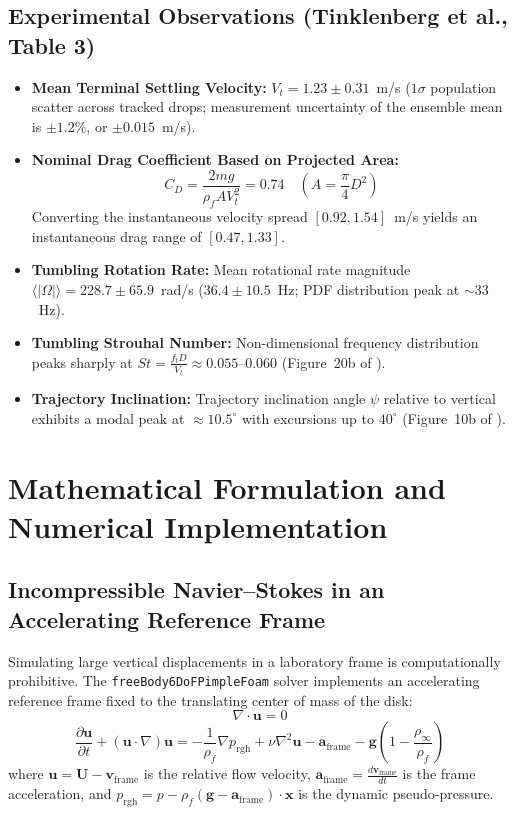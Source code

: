 \documentclass[11pt,a4paper]{article}
\begin{document}
\subsection{Experimental Observations (Tinklenberg et al., Table 3)}
\begin{itemize}
    \item \textbf{Mean Terminal Settling Velocity:} $V_t = 1.23 \pm 0.31$~m/s ($1\sigma$ population scatter across tracked drops; measurement uncertainty of the ensemble mean is $\pm 1.2\%$, or $\pm 0.015$~m/s).
    \item \textbf{Nominal Drag Coefficient Based on Projected Area:}
    \begin{equation}
    C_D = \frac{2 m g}{\rho_f A V_t^2} = 0.74 \quad \left(A = \frac{\pi}{4} D^2\right)
    \end{equation}
    Converting the instantaneous velocity spread $[0.92, 1.54]$~m/s yields an instantaneous drag range of $[0.47, 1.33]$.
    \item \textbf{Tumbling Rotation Rate:} Mean rotational rate magnitude $\langle |\Omega| \rangle = 228.7 \pm 65.9$~rad/s ($36.4 \pm 10.5$~Hz; PDF distribution peak at $\sim 33$~Hz).
    \item \textbf{Tumbling Strouhal Number:} Non-dimensional frequency distribution peaks sharply at $St = \frac{f_t D}{V_t} \approx 0.055$--$0.060$ (Figure~20b of \cite{tinklenberg2023}).
    \item \textbf{Trajectory Inclination:} Trajectory inclination angle $\psi$ relative to vertical exhibits a modal peak at $\approx 10.5^\circ$ with excursions up to $40^\circ$ (Figure~10b of \cite{tinklenberg2023}).
\end{itemize}

\section{Mathematical Formulation and Numerical Implementation}

\subsection{Incompressible Navier--Stokes in an Accelerating Reference Frame}
Simulating large vertical displacements in a laboratory frame is computationally prohibitive. The \texttt{freeBody6DoFPimpleFoam} solver implements an accelerating reference frame fixed to the translating center of mass of the disk:
\begin{equation}
\nabla \cdot \mathbf{u} = 0
\end{equation}
\begin{equation}
\frac{\partial \mathbf{u}}{\partial t} + (\mathbf{u} \cdot \nabla)\mathbf{u} = -\frac{1}{\rho_f} \nabla p_{\mathrm{rgh}} + \nu \nabla^2 \mathbf{u} - \mathbf{a}_{\mathrm{frame}} - \mathbf{g} \left(1 - \frac{\rho_\infty}{\rho_f}\right)
\end{equation}
where $\mathbf{u} = \mathbf{U} - \mathbf{v}_{\mathrm{frame}}$ is the relative flow velocity, $\mathbf{a}_{\mathrm{frame}} = \frac{d\mathbf{v}_{\mathrm{frame}}}{dt}$ is the frame acceleration, and $p_{\mathrm{rgh}} = p - \rho_f (\mathbf{g} - \mathbf{a}_{\mathrm{frame}}) \cdot \mathbf{x}$ is the dynamic pseudo-pressure.
\end{document}
